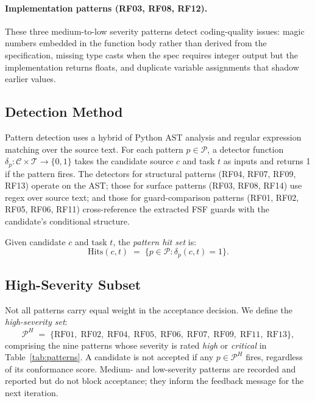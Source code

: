 \paragraph{Implementation patterns (RF03, RF08, RF12).}
These three medium-to-low severity patterns detect coding-quality issues:
magic numbers embedded in the function body rather than derived from the
specification, missing type casts when the spec requires integer output but
the implementation returns floats, and duplicate variable assignments that
shadow earlier values.

\subsection{Detection Method}
\label{subsec:method:detection}

Pattern detection uses a hybrid of Python AST analysis and regular expression
matching over the source text.  For each pattern $p \in \mathcal{P}$, a
detector function $\delta_p : \mathcal{C} \times \mathcal{T} \to \{0,1\}$
takes the candidate source $c$ and task $t$ as inputs and returns 1 if the
pattern fires.  The detectors for structural patterns (RF04, RF07, RF09,
RF13) operate on the AST; those for surface patterns (RF03, RF08, RF14)
use regex over source text; and those for guard-comparison patterns
(RF01, RF02, RF05, RF06, RF11) cross-reference the extracted FSF guards with
the candidate's conditional structure.

\begin{definition}
\label{def:pattern-hits}
Given candidate $c$ and task $t$, the \emph{pattern hit set} is:
\[
  \mathrm{Hits}(c, t) \;=\;
    \bigl\{p \in \mathcal{P} : \delta_p(c, t) = 1\bigr\}.
\]
\end{definition}

\subsection{High-Severity Subset}
\label{subsec:method:high-sev}

Not all patterns carry equal weight in the acceptance decision.  We define
the \emph{high-severity set}:
\begin{equation}
  \mathcal{P}^H \;=\;
    \{\text{RF01},\;\text{RF02},\;\text{RF04},\;\text{RF05},\;\text{RF06},\;
      \text{RF07},\;\text{RF09},\;\text{RF11},\;\text{RF13}\},
  \label{eq:high-sev}
\end{equation}
comprising the nine patterns whose severity is rated \emph{high} or
\emph{critical} in Table~\ref{tab:patterns}.  A candidate is not accepted
if any $p \in \mathcal{P}^H$ fires, regardless of its conformance score.
Medium- and low-severity patterns are recorded and reported but do not
block acceptance; they inform the feedback message for the next iteration.

